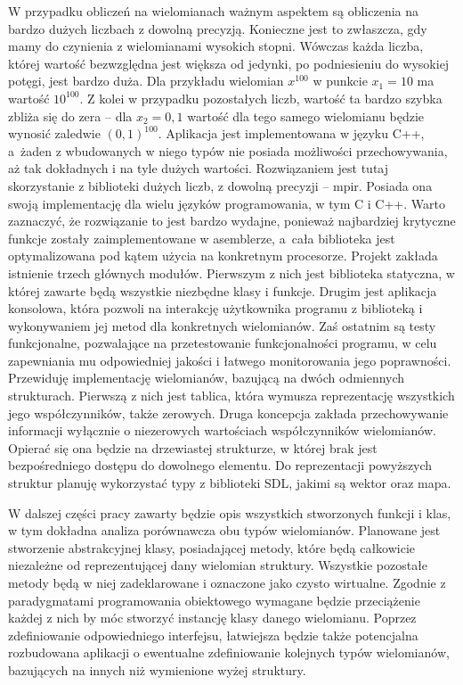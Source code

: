 W przypadku obliczeń na wielomianach ważnym aspektem są obliczenia na bardzo dużych liczbach z dowolną precyzją. Konieczne jest to zwłaszcza, gdy mamy do czynienia z wielomianami wysokich stopni. Wówczas każda liczba, której wartość bezwzględna jest większa od jedynki, po podniesieniu do wysokiej potęgi, jest bardzo duża. Dla przykładu wielomian $x^{100}$ w punkcie $x_1=10$ ma wartość $10^{100}$. Z kolei w przypadku pozostałych liczb, wartość ta bardzo szybka zbliża się do zera – dla $x_2=0,1$ wartość dla tego samego wielomianu będzie wynosić zaledwie $(0,1)^{100}$. Aplikacja jest implementowana w języku C++, a~żaden z wbudowanych w niego typów nie posiada możliwości przechowywania, aż tak dokładnych i na tyle dużych wartości. Rozwiązaniem jest tutaj skorzystanie z biblioteki dużych liczb, z dowolną precyzji – mpir. Posiada ona swoją implementację dla wielu języków programowania, w tym C i C++.  Warto zaznaczyć, że rozwiązanie to jest bardzo wydajne, ponieważ najbardziej krytyczne funkcje zostały zaimplementowane w asemblerze, a~cała biblioteka jest optymalizowana pod kątem użycia na konkretnym procesorze.
Projekt zakłada istnienie trzech głównych modułów. Pierwszym z nich jest biblioteka statyczna, w której zawarte będą wszystkie niezbędne klasy i funkcje. Drugim jest aplikacja konsolowa, która pozwoli na interakcję użytkownika programu z biblioteką i wykonywaniem jej metod dla konkretnych wielomianów. Zaś ostatnim są testy funkcjonalne, pozwalające na przetestowanie funkcjonalności programu, w celu zapewniania mu odpowiedniej jakości i łatwego monitorowania jego poprawności.
Przewiduję implementację wielomianów, bazującą na dwóch odmiennych strukturach. Pierwszą z nich jest tablica, która wymusza reprezentację wszystkich jego współczynników, także zerowych. Druga koncepcja zakłada przechowywanie informacji wyłącznie o niezerowych wartościach  współczynników wielomianów. Opierać się ona będzie na drzewiastej strukturze, w której brak jest bezpośredniego dostępu do dowolnego elementu. Do reprezentacji powyższych struktur planuję wykorzystać typy z biblioteki SDL, jakimi są wektor oraz mapa.

W dalszej części pracy zawarty będzie opis wszystkich stworzonych funkcji i klas, w tym dokładna analiza porównawcza obu typów wielomianów. Planowane jest stworzenie abstrakcyjnej klasy, posiadającej metody, które będą całkowicie niezależne od reprezentującej dany wielomian struktury. Wszystkie pozostałe metody będą w niej zadeklarowane i oznaczone jako czysto wirtualne. Zgodnie z paradygmatami programowania obiektowego wymagane będzie przeciążenie każdej z nich by móc stworzyć instancję klasy danego wielomianu. Poprzez zdefiniowanie odpowiedniego interfejsu, łatwiejsza będzie także potencjalna rozbudowana aplikacji o ewentualne zdefiniowanie kolejnych typów wielomianów, bazujących na innych niż wymienione wyżej struktury.

